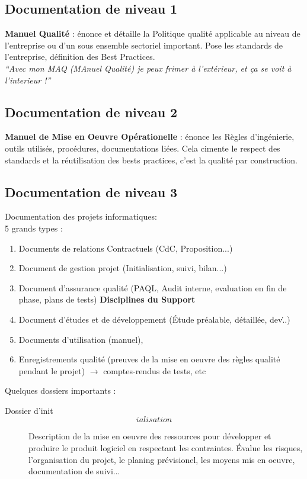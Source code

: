 \begin{description}
	\subsection{Documentation de niveau 1}

\textbf{Manuel Qualité} : énonce et détaille la Politique qualité applicable au niveau de l’entreprise ou d’un sous ensemble sectoriel important. 
Pose les standards de l’entreprise, définition des Best Practices.\\

\textit{“Avec mon MAQ (MAnuel Qualité) je peux frimer à l’extérieur, et ça se voit à l’interieur !”}

	\subsection{Documentation de niveau 2}

\textbf{Manuel de Mise en Oeuvre Opérationelle} : énonce les Règles d’ingénierie, outils utilisés, procédures, documentations liées.
Cela cimente le respect des standards et la réutilisation des bests practices, c’est la qualité par construction.

	\subsection{Documentation de niveau 3}

Documentation des projets informatiques: \\

5 grands types : 
\begin{enumerate}
\item Documents de relations Contractuels (CdC, Proposition...)
\item Document de gestion projet (Initialisation, suivi, bilan...)
\item Document d’assurance qualité (PAQL, Audit interne, evaluation en fin de phase, plans de tests) \textbf{Disciplines du Support}
\item Document d’études et de développement (Étude préalable, détaillée, dev\...)
\item Documents d’utilisation (manuel), 
\item Enregistrements qualité (preuves de la mise en oeuvre des règles qualité pendant le projet) $\rightarrow$ comptes-rendus de tests, etc
\end{enumerate}

Quelques dossiers importants :
\begin{description}
\item[Dossier d’init\[ialisation\]] Description de la mise en oeuvre des ressources pour développer et produire le produit logiciel en respectant les contraintes. 
Évalue les risques, l’organisation du projet, le planing prévisionel, les moyens mis en oeuvre, documentation de suivi...


\end{description}
\end{description}
